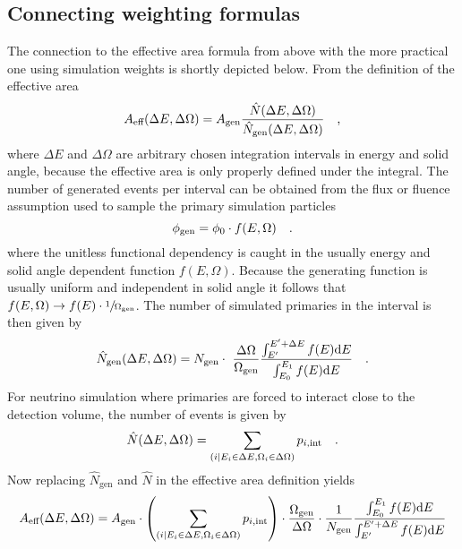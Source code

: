 \subsection{Connecting weighting formulas}
The connection to the effective area formula from above with the more practical one using simulation weights is shortly depicted below.
From the definition of the effective area
\begin{equation}
  A_\text{eff}(\Delta E, \Delta \Omega) =
    A_\text{gen} \frac{\hat{N}(\Delta E, \Delta \Omega)}
                      {\hat{N}_\text{gen}(\Delta E, \Delta \Omega)}
  \quad\text{,}
\end{equation}
where $\Delta E$ and $\Delta \Omega$ are arbitrary chosen integration intervals in energy and solid angle, because the effective area is only properly defined under the integral.
The number of generated events per interval can be obtained from the flux or fluence assumption used to sample the primary simulation particles
\begin{equation}
  \phi_\text{gen} = \phi_0 \cdot f(E, \Omega)
  \quad\text{.}
\end{equation}
where the unitless functional dependency is caught in the usually energy and solid angle dependent function $f(E, \Omega)$.
Because the generating function is usually uniform and independent in solid angle it follows that $f(E, \Omega) \rightarrow f(E)\cdot \sfrac{1}{\Omega_\text{gen}}$.
The number of simulated primaries in the interval is then given by
\begin{equation}
  \hat{N}_\text{gen}(\Delta E, \Delta\Omega) =
    N_\text{gen} \cdot \frac{\Delta\Omega}{\Omega_\text{gen}}
    \frac{\int_{E'}^{E'+\Delta E} f(E) \d{E}}
         {\int_{E_0}^{E_1} f(E) \d{E}}
  \mperiod
\end{equation}
For neutrino simulation where primaries are forced to interact close to the detection volume, the number of events is given by
\begin{equation}
  \hat{N}(\Delta E, \Delta \Omega) =
  \sum_{(i|E_i\in\Delta E, \Omega_i\in\Delta\Omega)} p_{i,\text{int}}
  \quad\text{.}
\end{equation}
Now replacing $\hat{N}_\text{gen}$ and $\hat{N}$ in the effective area definition yields
\begin{equation}
  A_\text{eff}(\Delta E, \Delta \Omega) =
    A_\text{gen} \cdot
    \left(\sum_{(i|E_i\in\Delta E, \Omega_i\in\Delta\Omega)}
          p_{i,\text{int}}\right) \cdot
    \frac{\Omega_\text{gen}}{\Delta\Omega} \cdot \frac{1}{N_\text{gen}}
    \frac{\int_{E_0}^{E_1} f(E) \mathrm{d}E}
         {\int_{E'}^{E'+\Delta E} f(E) \mathrm{d}E}
\end{equation}
